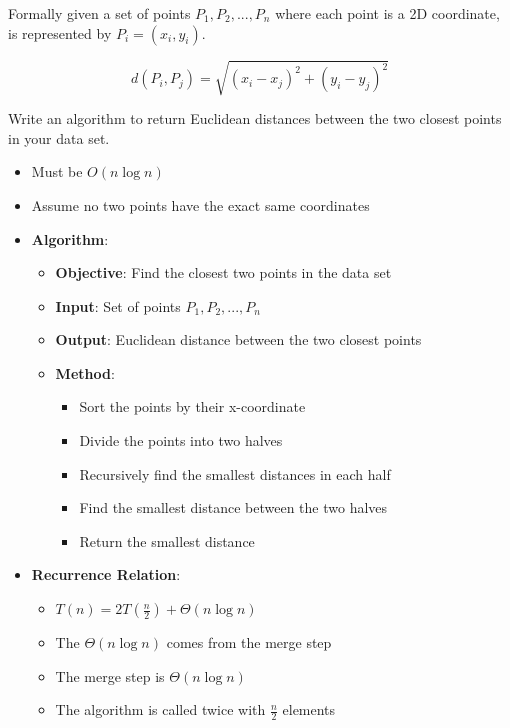 \documentclass{article}[12pt]
\begin{document}
Formally given a set of points {$P_1, P_2, ... , P_n$} where each point is a 2D coordinate,
is represented by $P_i = (x_i, y_i)$.

\begin{equation*}
  d(P_i, P_j) = \sqrt{(x_i - x_j)^2 + (y_i - y_j)^2}
\end{equation*}

Write an algorithm to return Euclidean distances between the two closest points in your data set.
\begin{itemize}
  \item Must be $O(n \log n)$
  \item Assume no two points have the exact same coordinates
\end{itemize}

\begin{itemize}
  \item \textbf{Algorithm}:
    \begin{itemize}
      \item \textbf{Objective}: Find the closest two points in the data set
      \item \textbf{Input}: Set of points {$P_1, P_2, ... , P_n$}
      \item \textbf{Output}: Euclidean distance between the two closest points
      \item \textbf{Method}:
        \begin{itemize}
          \item Sort the points by their x-coordinate
          \item Divide the points into two halves
          \item Recursively find the smallest distances in each half
          \item Find the smallest distance between the two halves
          \item Return the smallest distance
        \end{itemize}
    \end{itemize}
\end{itemize}

\begin{itemize}
  \item \textbf{Recurrence Relation}:
    \begin{itemize}
      \item $T(n) = 2T(\frac{n}{2}) + \Theta(n \log n)$
      \item The $\Theta(n \log n)$ comes from the merge step
      \item The merge step is $\Theta(n \log n)$
      \item The algorithm is called twice with $\frac{n}{2}$ elements
    \end{itemize}
\end{itemize}
\end{document}
